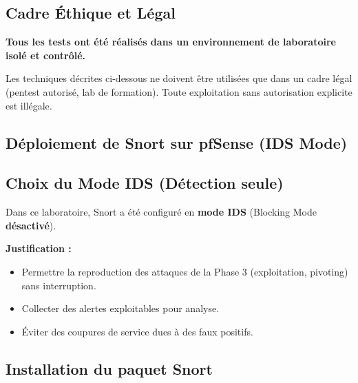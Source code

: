 \documentclass[12pt,a4paper,openany]{report}
\begin{document}
	\subsection{Cadre Éthique et Légal}
	
	\begin{tcolorbox}[colback=accent!5!white, colframe=accent, title=\textbf{AVERTISSEMENT LÉGAL}]
		\textbf{Tous les tests ont été réalisés dans un environnement de laboratoire isolé et contrôlé.}
		
		Les techniques décrites ci-dessous ne doivent être utilisées que dans un cadre légal (pentest autorisé, lab de formation). Toute exploitation sans autorisation explicite est illégale.
	\end{tcolorbox}
	
	\subsection{Déploiement de Snort sur pfSense (IDS Mode)}
	
	\subsection{Choix du Mode IDS (Détection seule)}
	
	\begin{tcolorbox}[colback=secondary!5!white, colframe=secondary, title=\textbf{Choix de conception : IDS Mode}]
		Dans ce laboratoire, Snort a été configuré en \textbf{mode IDS} (Blocking Mode \textbf{désactivé}).
		
		\textbf{Justification :}
		\begin{itemize}
			\item Permettre la reproduction des attaques de la Phase 3 (exploitation, pivoting) sans interruption.
			\item Collecter des alertes exploitables pour analyse.
			\item Éviter des coupures de service dues à des faux positifs.
		\end{itemize}
	\end{tcolorbox}
	
	\subsection{Installation du paquet Snort}
	
\end{document}
